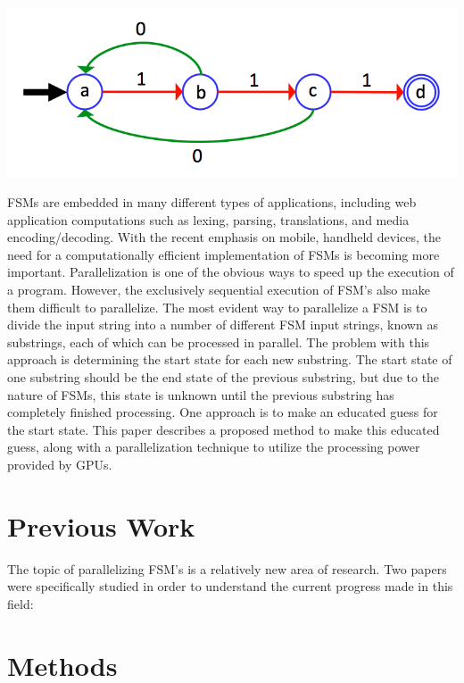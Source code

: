 \documentclass{sigplanconf}
\begin{document}
\includegraphics[width=\linewidth]{fsm_diagram.png}

FSMs are embedded in many different types of applications, including web application computations such as lexing, parsing, translations, and media encoding/decoding. With the recent emphasis on mobile, handheld devices, the need for a computationally efficient implementation of FSMs is becoming more important. Parallelization is one of the obvious ways to speed up the execution of a program. However, the exclusively sequential execution of FSM's also make them difficult to parallelize. The most evident way to parallelize a FSM is to divide the input string into a number of different FSM input strings, known as substrings, each of which can be processed in parallel. The problem with this approach is determining the start state for each new substring. The start state of one substring should be the end state of the previous substring, but due to the nature of FSMs, this state is unknown until the previous substring has completely finished processing. One approach is to make an educated guess for the start state. This paper describes a proposed method to make this educated guess, along with a parallelization technique to utilize the processing power provided by GPUs.

\section{Previous Work}
The topic of parallelizing FSM's is a relatively new area of research. Two papers were specifically studied in order to understand the current progress made in this field: 


\section{Methods}
\end{document}
